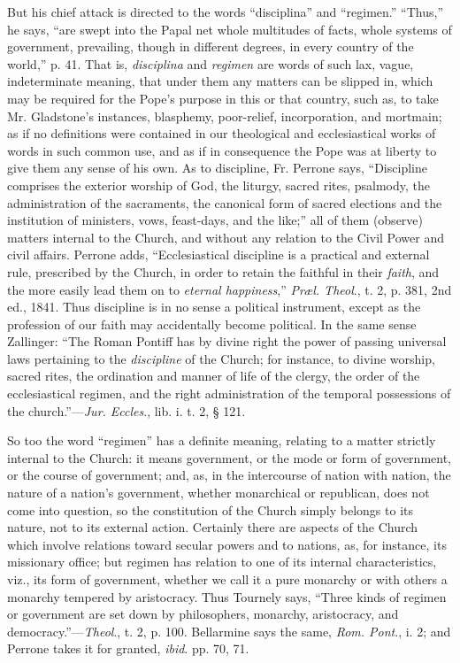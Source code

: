 But his chief attack is directed to the words ``disciplina''
and ``regimen.'' ``Thus,'' he says, ``are swept
into the Papal net whole multitudes of facts, whole systems of
government, prevailing, though in different degrees, in every country of
the world,'' p. 41. That is, \emph{disciplina} and \emph{regimen}
are words of such lax, vague, indeterminate meaning, that under them any
matters can be slipped in, which may be required for the Pope's purpose
in this or that country, such as, to take Mr. Gladstone's instances,
blasphemy, poor-relief, incorporation, and mortmain; as if no
definitions were contained in our theological and ecclesiastical works
of words in such common use, and as if in consequence the Pope was at
liberty to give them any sense of his own. As to discipline, Fr. Perrone
says, ``Discipline comprises the exterior worship of God, the
liturgy, sacred rites, psalmody, the administration of the sacraments,
the canonical form of sacred elections and the institution of ministers,
vows, feast-days, and the like;'' all of them (observe) matters
internal to the Church, and without any relation to the Civil Power and
civil affairs. Perrone adds, ``Ecclesiastical discipline is a
practical and external rule, prescribed by the Church, in order to
retain the faithful in their \emph{faith}, and the more easily lead them
on to \emph{eternal happiness},'' \emph{Præl. Theol}., t. 2, p.
381, 2nd ed., 1841. Thus discipline is in no sense a political
instrument, except as the profession of our faith may accidentally
become political. In the same sense Zallinger: ``The Roman Pontiff
has by divine right the power of passing universal laws pertaining to
the \emph{discipline} of the Church; for instance, to divine worship,
sacred rites, the ordination and manner of life of the clergy, the order
of the ecclesiastical regimen, and the right administration of the
temporal possessions of the church.''—\emph{Jur. Eccles}., lib. i. t. 2,
§ 121.

So too the word ``regimen'' has a definite meaning, relating
to a matter strictly internal to the Church: it means government, or the
mode or form of government, or the course of government; and, as, in the
intercourse of nation with nation, the nature of a nation's government,
whether monarchical or republican, does not come into question, so the
constitution of the Church simply belongs to its nature, not to its
external action. Certainly there are aspects of the Church which involve
relations toward secular powers and to nations, as, for instance, its
missionary office; but regimen has relation to one of its internal
characteristics, viz., its form of government, whether we call it a pure
monarchy or with others a monarchy tempered by aristocracy. Thus
Tournely says, ``Three kinds of regimen or government are set down
by philosophers, monarchy, aristocracy, and democracy.''—\emph{Theol}.,
t. 2, p. 100. Bellarmine says the same, \emph{Rom. Pont}., i. 2; and
Perrone takes it for granted, \emph{ibid}. pp. 70, 71.

